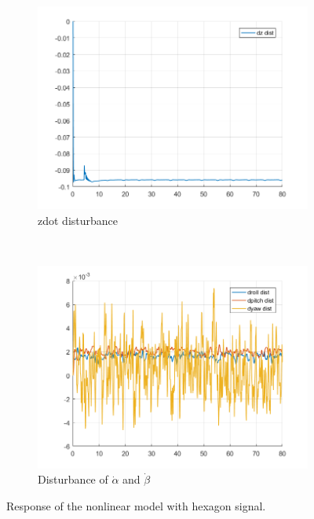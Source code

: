 \documentclass[11pt]{article}
\begin{document}
\begin{enumerate}
\begin{figure}[ht]
        \begin{subfigure}[c]{0.3\linewidth}
            \centering
            \includegraphics[width=\linewidth]{Plots_12_NonlinearModel_Hexagon/10}
            \caption{zdot disturbance}
        \end{subfigure}
        ~
        \begin{subfigure}[c]{0.3\linewidth}
            \centering
            \includegraphics[width=\linewidth]{Plots_12_NonlinearModel_Hexagon/11}
            \caption{Disturbance of $\dot{\alpha}$ and $\dot{\beta}$}
        \end{subfigure}
        
        \caption{Response of the nonlinear model with hexagon signal.}
        \label{fig:nonlinear_model_hexagon_signal}
\end{figure}


\end{enumerate}
\end{document}
